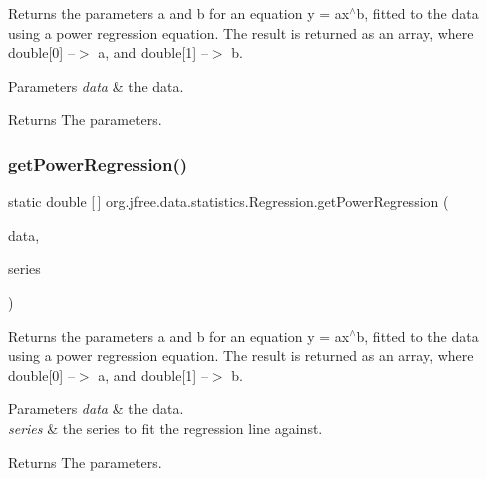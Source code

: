 Returns the parameters \textquotesingle{}a\textquotesingle{} and \textquotesingle{}b\textquotesingle{} for an equation y = ax$^\wedge$b, fitted to the data using a power regression equation. The result is returned as an array, where double\mbox{[}0\mbox{]} --$>$ a, and double\mbox{[}1\mbox{]} --$>$ b.


\begin{DoxyParams}{Parameters}
{\em data} & the data.\\
\hline
\end{DoxyParams}
\begin{DoxyReturn}{Returns}
The parameters. 
\end{DoxyReturn}
\mbox{\label{classorg_1_1jfree_1_1data_1_1statistics_1_1_regression_a1ce6a23a7227c4dfab01a37fa21dfff0}} 
\subsubsection{\texorpdfstring{get\+Power\+Regression()}{getPowerRegression()}\hspace{0.1cm}{\footnotesize\ttfamily [2/2]}}
{\footnotesize\ttfamily static double \mbox{[}$\,$\mbox{]} org.\+jfree.\+data.\+statistics.\+Regression.\+get\+Power\+Regression (\begin{DoxyParamCaption}\item[{\mbox{\hyperlink{interfaceorg_1_1jfree_1_1data_1_1xy_1_1_x_y_dataset}{X\+Y\+Dataset}}}]{data,  }\item[{int}]{series }\end{DoxyParamCaption})\hspace{0.3cm}{\ttfamily [static]}}

Returns the parameters \textquotesingle{}a\textquotesingle{} and \textquotesingle{}b\textquotesingle{} for an equation y = ax$^\wedge$b, fitted to the data using a power regression equation. The result is returned as an array, where double\mbox{[}0\mbox{]} --$>$ a, and double\mbox{[}1\mbox{]} --$>$ b.


\begin{DoxyParams}{Parameters}
{\em data} & the data. \\
\hline
{\em series} & the series to fit the regression line against.\\
\hline
\end{DoxyParams}
\begin{DoxyReturn}{Returns}
The parameters. 
\end{DoxyReturn}


